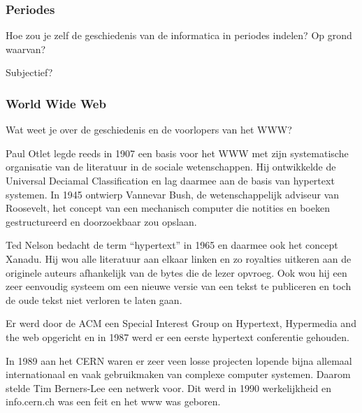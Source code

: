 \documentclass[../main.tex]{subfiles}
\begin{document}
\subsubsection{Periodes}
\begin{question}
Hoe zou je zelf de geschiedenis van de informatica in periodes indelen? Op grond waarvan?
\end{question}
\begin{solution} Subjectief?
\end{solution}

\subsubsection{World Wide Web}
\begin{question}
Wat weet je over de geschiedenis en de voorlopers van het WWW?
\end{question}
\begin{solution}
Paul Otlet legde reeds in 1907 een basis voor het WWW met zijn systematische organisatie van de literatuur in de sociale wetenschappen.
Hij ontwikkelde de Universal Deciamal Classification en lag daarmee aan de basis van hypertext systemen.
In 1945 ontwierp Vannevar Bush, de wetenschappelijk adviseur van Roosevelt, het concept van een mechanisch  computer die notities en boeken gestructureerd en doorzoekbaar zou opslaan.

Ted Nelson bedacht de term ``hypertext'' in 1965 en daarmee ook het concept Xanadu.
Hij wou alle literatuur aan elkaar linken en zo royalties uitkeren aan de originele auteurs afhankelijk van de bytes die de lezer opvroeg.
Ook wou hij een zeer eenvoudig systeem om een nieuwe versie van een tekst te publiceren en toch de oude tekst niet verloren te laten gaan.

Er werd door de ACM een Special Interest Group on Hypertext, Hypermedia and the web opgericht en in 1987  werd er een eerste hypertext conferentie gehouden.

In 1989 aan het CERN waren er zeer veen losse projecten lopende bijna allemaal internationaal en vaak gebruikmaken van complexe computer systemen.
Daarom stelde Tim Berners-Lee een netwerk voor.
Dit werd in 1990 werkelijkheid en info.cern.ch was een feit en het www was geboren.
\end{solution}
\end{document}
